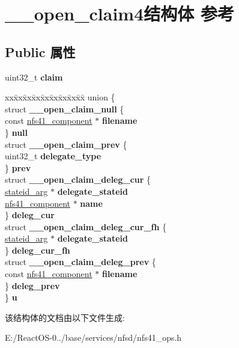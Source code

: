 \hypertarget{struct____open__claim4}{}\section{\+\_\+\+\_\+open\+\_\+claim4结构体 参考}
\label{struct____open__claim4}
\subsection*{Public 属性}
\begin{DoxyCompactItemize}
\item 
\mbox{\label{struct____open__claim4_a414c243a67d7bf17517ab7d31bcee265}} 
uint32\+\_\+t {\bfseries claim}
\item 
\mbox{\label{struct____open__claim4_ad05900dc40d10295b9d4bb29523ada34}} 
\begin{tabbing}
xx\=xx\=xx\=xx\=xx\=xx\=xx\=xx\=xx\=\kill
union \{\\
\>struct {\bfseries \_\_open\_claim\_null} \{\\
\>\>const \hyperlink{struct____nfs41__component}{nfs41\_component} $\ast$ {\bfseries filename}\\
\>\} {\bfseries null}\\
\>struct {\bfseries \_\_open\_claim\_prev} \{\\
\>\>uint32\_t {\bfseries delegate\_type}\\
\>\} {\bfseries prev}\\
\>struct {\bfseries \_\_open\_claim\_deleg\_cur} \{\\
\>\>\hyperlink{struct____stateid__arg}{stateid\_arg} $\ast$ {\bfseries delegate\_stateid}\\
\>\>\hyperlink{struct____nfs41__component}{nfs41\_component} $\ast$ {\bfseries name}\\
\>\} {\bfseries deleg\_cur}\\
\>struct {\bfseries \_\_open\_claim\_deleg\_cur\_fh} \{\\
\>\>\hyperlink{struct____stateid__arg}{stateid\_arg} $\ast$ {\bfseries delegate\_stateid}\\
\>\} {\bfseries deleg\_cur\_fh}\\
\>struct {\bfseries \_\_open\_claim\_deleg\_prev} \{\\
\>\>const \hyperlink{struct____nfs41__component}{nfs41\_component} $\ast$ {\bfseries filename}\\
\>\} {\bfseries deleg\_prev}\\
\} {\bfseries u}\\

\end{tabbing}\end{DoxyCompactItemize}


该结构体的文档由以下文件生成\+:\begin{DoxyCompactItemize}
\item 
E\+:/\+React\+O\+S-\/0../base/services/nfsd/nfs41\+\_\+ops.\+h\end{DoxyCompactItemize}
